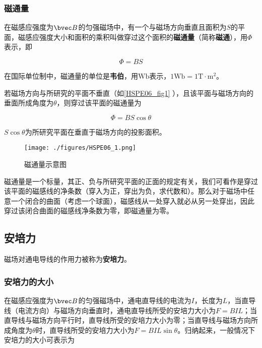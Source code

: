 \subsubsection{磁通量}

在磁感应强度为$\bvec B$的匀强磁场中，有一个与磁场方向垂直且面积为$S$的平面，磁感应强度大小和面积的乘积叫做穿过这个面积的\textbf{磁通量}（简称\textbf{磁通}），用$\Phi$表示，即

\begin{equation}
\Phi = BS
\end{equation}

在国际单位制中，磁通量的单位是\textbf{韦伯}，用$\mathrm{Wb}$表示，$1\mathrm{Wb}=1\mathrm{T\cdot m^2}$。

若磁场方向与所研究的平面不垂直（如\autoref{HSPE06_fig1} ），且该平面与磁场方向的垂面所成角度为$\theta$，则穿过该平面的磁通量为

\begin{equation}
\Phi = BS\cos\theta
\end{equation}

$S\cos\theta$为所研究平面在垂直于磁场方向的投影面积。

\begin{figure}[ht]
\centering
\texttt{[image: ./figures/HSPE06\_1.png]}
\caption{磁通量示意图} \label{HSPE06_fig1}
\end{figure}


磁通量是一个标量，其正、负与所研究平面的正面的规定有关，我们可看作是穿过该平面的磁感线的净条数（穿入为正，穿出为负，求代数和）。那么对于磁场中任意一个闭合的曲面（考虑一个球面），磁感线从一处穿入就必从另一处穿出，因此穿过该闭合曲面的磁感线净条数为零，即磁通量为零。

\subsection{安培力}

磁场对通电导线的作用力被称为\textbf{安培力}。

\subsubsection{安培力的大小}

在磁感应强度为$\bvec B$的匀强磁场中，通电直导线的电流为$I$，长度为$L$，当直导线（电流方向）与磁场方向垂直时，通电直导线所受的安培力大小为$F=BIL$；当直导线与磁场方向平行时，直导线所受的安培力大小为零；当直导线与磁场方向所成角度为$\theta$时，直导线所受的安培力大小为$F=BIL\sin\theta$。归纳起来，一般情况下安培力的大小可表示为

